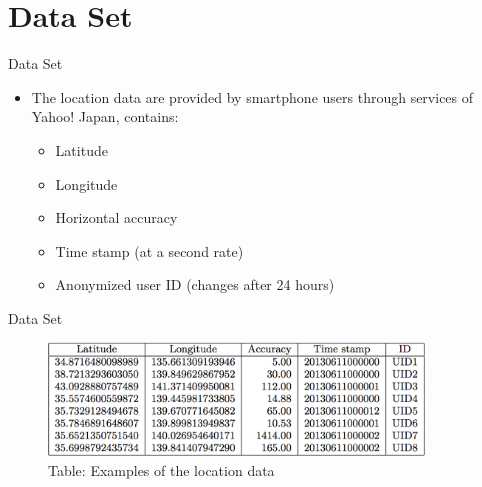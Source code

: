 \section{Data Set}\label{data-set}

\begin{frame}{Data Set}

\begin{itemize}
\itemsep1pt\parskip0pt
\item
  The location data are provided by smartphone users through services of
  Yahoo! Japan, contains:

  \begin{itemize}
  \itemsep1pt\parskip0pt
  \item
    Latitude
  \item
    Longitude
  \item
    Horizontal accuracy
  \item
    Time stamp (at a second rate)
  \item
    Anonymized user ID (changes after 24 hours)
  \end{itemize}
\end{itemize}

\end{frame}

\begin{frame}{Data Set}

\begin{figure}
\includegraphics[width = 10cm]{pic1.png}\\
Table: Examples of the location data
\end{figure}

\end{frame}

